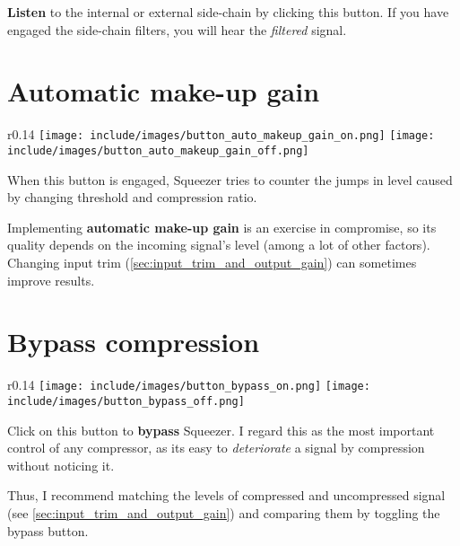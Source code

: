 \textbf{Listen} to the internal or external side-chain by clicking
this button.  If you have engaged the side-chain filters, you will
hear the \emph{filtered} signal.

\section{Automatic make-up gain}
\label{sec:buttons_automatic_makeup_gain}

\begin{wrapfigure}{r}{0.14\linewidth}
  \texttt{[image: include/images/button\_auto\_makeup\_gain\_on.png]}
  \newline \vspace{-0.9\baselineskip}
  \texttt{[image: include/images/button\_auto\_makeup\_gain\_off.png]}
\end{wrapfigure}

When this button is engaged, Squeezer tries to counter the jumps in
level caused by changing threshold and compression ratio.

Implementing \textbf{automatic make-up gain} is an exercise in
compromise, so its quality depends on the incoming signal's level
(among a lot of other factors).  Changing input trim
(\ref{sec:input_trim_and_output_gain}) can sometimes improve results.

\newpage %

\section{Bypass compression}

\begin{wrapfigure}{r}{0.14\linewidth}
  \texttt{[image: include/images/button\_bypass\_on.png]}
  \newline \vspace{-0.9\baselineskip}
  \texttt{[image: include/images/button\_bypass\_off.png]}
\end{wrapfigure}

Click on this button to \textbf{bypass} Squeezer.  I regard this as
the most important control of any compressor, as its easy to
\emph{deteriorate} a signal by compression without noticing it.

Thus, I recommend matching the levels of compressed and uncompressed
signal (see \ref{sec:input_trim_and_output_gain}) and comparing them
by toggling the bypass button.

